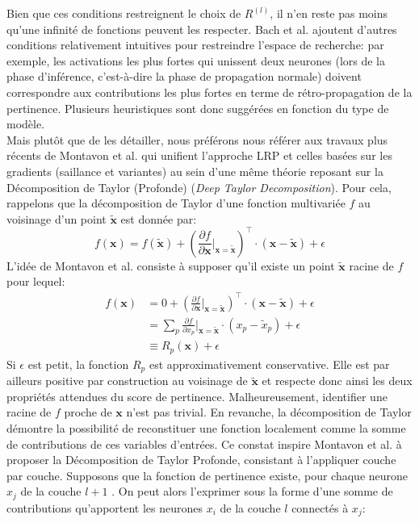 Bien que ces conditions restreignent le choix de $R^{(l)}$, il n'en reste pas moins qu'une infinité de fonctions peuvent les respecter. Bach et al. ajoutent d'autres conditions relativement intuitives pour restreindre l'espace de recherche: par exemple, les activations les plus fortes qui unissent deux neurones (lors de la phase d'inférence, c'est-à-dire la phase de propagation normale) doivent correspondre aux contributions les plus fortes en terme de rétro-propagation de la pertinence. Plusieurs heuristiques sont donc suggérées en fonction du type de modèle. \\
Mais plutôt que de les détailler, nous préférons nous référer aux travaux plus récents de Montavon et al. \cite{montavonExplainingNonlinearClassification2017, montavonLayerWiseRelevancePropagation2019} qui unifient l'approche LRP et celles basées sur les gradients (saillance et variantes) au sein d'une même théorie reposant sur la Décomposition de Taylor (Profonde) (\textit{Deep Taylor Decomposition}). Pour cela, rappelons que la décomposition de Taylor d'une fonction multivariée $f$ au voisinage d'un point $\mathbf{\tilde{x}}$ est donnée par:
\begin{equation}
	f(\mathbf{x}) = f(\mathbf{\tilde{x}}) + \left( \frac{\partial f}{\partial \mathbf{x}}|_{\mathbf{x}=\mathbf{\tilde{x}}} \right)^\intercal \cdot(\mathbf{x}-\mathbf{\tilde{x}}) + \epsilon 
\end{equation}
L'idée de Montavon et al. consiste à supposer qu'il existe un point $\mathbf{\tilde{x}}$ racine de $f$ pour lequel:
\begin{align*}
	f(\mathbf{x}) &= 0 + \left( \frac{\partial f}{\partial \mathbf{x}}|_{\mathbf{x}=\mathbf{\tilde{x}}} \right)^\intercal \cdot(\mathbf{x}-\mathbf{\tilde{x}}) + \epsilon 
	\\
	&= \sum_p \frac{\partial f }{\partial x_p}|_{\mathbf{x}=\mathbf{\tilde{x}}}\cdot(x_p - \tilde{x}_p) + \epsilon
	\\
	&\equiv R_p({\mathbf{x}}) + \epsilon
\end{align*}
Si $\epsilon$ est petit, la fonction $R_p$ est approximativement conservative. Elle est par ailleurs positive par construction au voisinage de $\mathbf{\tilde{x}}$ et respecte donc ainsi les deux propriétés attendues du score de pertinence. Malheureusement, identifier une racine de $f$ proche de $\mathbf{x}$ n'est pas trivial. En revanche, la décomposition de Taylor démontre la possibilité de reconstituer une fonction localement comme la somme de contributions de ces variables d'entrées. Ce constat inspire Montavon et al. à proposer la Décomposition de Taylor Profonde, consistant à l'appliquer couche par couche. Supposons que la fonction de pertinence existe, pour chaque neurone $x_j$ de la couche $l+1$ . On peut alors l'exprimer sous la forme d'une somme de contributions qu'apportent les neurones $x_i$ de la couche $l$ connectés à $x_j$:
